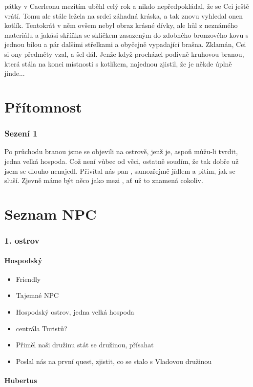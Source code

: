 \documentclass[a4paper,twocolumn,openany,nodeprecatedcode, justified]{dndbook}
\newcommand{\bi}{\begin{itemize}}
\newcommand{\ei}{\end{itemize}}
\begin{document}
	pátky v Caerleonu mezitím uběhl celý rok a nikdo nepředpokládal, že se Cei ještě vrátí. Tomu ale stále ležela na srdci záhadná kráska, a tak znovu vyhledal onen kotlík. Tentokrát v něm ovšem nebyl obraz krásné dívky, ale hůl z neznámého materiálu a jakási skříňka se sklíčkem zasazeným do zdobného bronzového kovu s jednou bílou a pár dalšími střelkami a obyčejně vypadající brašna. Zklamán, Cei si ony předměty vzal, a šel dál. Jenže když procházel podivně kruhovou branou, která stála na konci místnosti s kotlíkem, najednou zjistil, že je někde úplně jinde...
	
	
	\part{Přítomnost}
	\section{Sezení 1}
	Po průchodu branou jsme se objevili na ostrově, jenž je, aspoň můžu-li tvrdit, jedna velká hospoda. Což není vůbec od věci, ostatně soudím, že tak dobře už jsem se dlouho nenajedl. Přivítal nás pan , samozřejmě jídlem a pitím, jak se sluší. Zjevně máme být něco jako  mezi , ať už to znamená cokoliv.
	
	\part{Seznam NPC}
	\section{1. ostrov}
	\subsection{Hospodský}
	\bi
		\item Friendly
		\item Tajemné NPC
		\item Hospodský ostrov, jedna velká hospoda
		\item centrála Turistů?
		\item Přiměl naši družinu stát se družinou, přísahat
		\item Poslal nás na první quest, zjistit, co se stalo s Vladovou družinou
	\ei
	\subsection{Hubertus}
	
	
	
\end{document}
